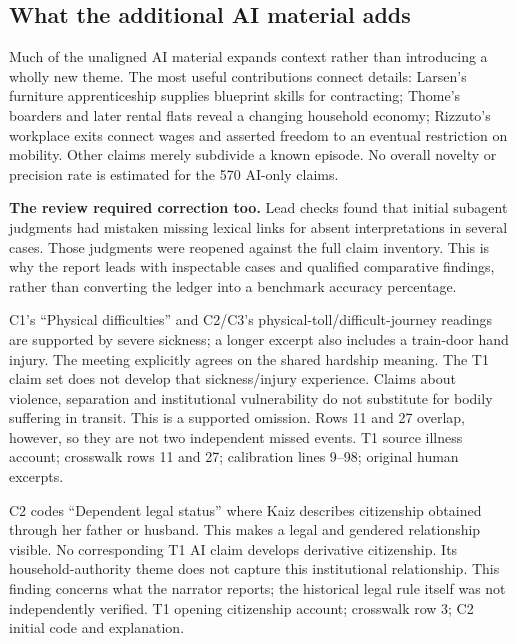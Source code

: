 \subsection*{What the additional AI material adds}
Much of the unaligned AI material expands context rather than introducing a wholly new theme. The most useful contributions connect details: Larsen's furniture apprenticeship supplies blueprint skills for contracting; Thome's boarders and later rental flats reveal a changing household economy; Rizzuto's workplace exits connect wages and asserted freedom to an eventual restriction on mobility. Other claims merely subdivide a known episode. No overall novelty or precision rate is estimated for the 570 AI-only claims.

\begin{caution}
\textbf{The review required correction too.} Lead checks found that initial subagent judgments had mistaken missing lexical links for absent interpretations in several cases. Those judgments were reopened against the full claim inventory. This is why the report leads with inspectable cases and qualified comparative findings, rather than converting the ledger into a benchmark accuracy percentage.
\end{caution}

{C1's ``Physical difficulties'' and C2/C3's physical-toll/difficult-journey readings are supported by severe sickness; a longer excerpt also includes a train-door hand injury. The meeting explicitly agrees on the shared hardship meaning.}
{The T1 claim set does not develop that sickness/injury experience. Claims about violence, separation and institutional vulnerability do not substitute for bodily suffering in transit. This is a supported omission. Rows 11 and 27 overlap, however, so they are not two independent missed events.}
{T1 source illness account; crosswalk rows 11 and 27; calibration lines 9--98; original human excerpts.}

{C2 codes ``Dependent legal status'' where Kaiz describes citizenship obtained through her father or husband. This makes a legal and gendered relationship visible.}
{No corresponding T1 AI claim develops derivative citizenship. Its household-authority theme does not capture this institutional relationship. This finding concerns what the narrator reports; the historical legal rule itself was not independently verified.}
{T1 opening citizenship account; crosswalk row 3; C2 initial code and explanation.}

